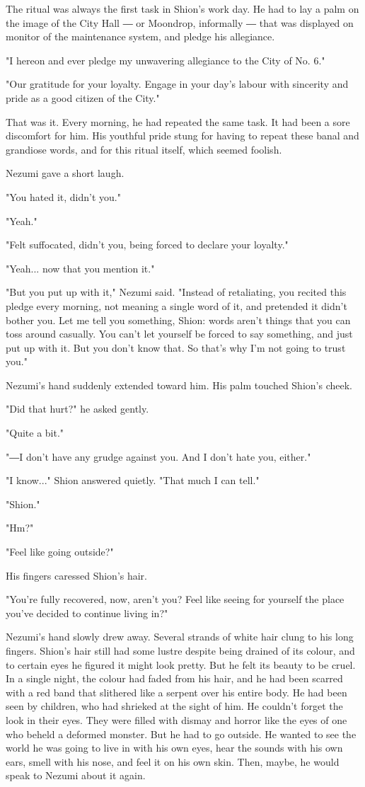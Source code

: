The ritual was always the first task in Shion's work day. He had to lay
a palm on the image of the City Hall ― or Moondrop, informally ― that
was displayed on monitor of the maintenance system, and pledge his
allegiance.

"I hereon and ever pledge my unwavering allegiance to the City of No.
6."

"Our gratitude for your loyalty. Engage in your day's labour with
sincerity and pride as a good citizen of the City."

That was it. Every morning, he had repeated the same task. It had been a
sore discomfort for him. His youthful pride stung for having to repeat
these banal and grandiose words, and for this ritual itself, which
seemed foolish.

Nezumi gave a short laugh.

"You hated it, didn't you."

"Yeah."

"Felt suffocated, didn't you, being forced to declare your loyalty."

"Yeah... now that you mention it."

"But you put up with it," Nezumi said. "Instead of retaliating, you
recited this pledge every morning, not meaning a single word of it, and
pretended it didn't bother you. Let me tell you something, Shion: words
aren't things that you can toss around casually. You can't let yourself
be forced to say something, and just put up with it. But you don't know
that. So that's why I'm not going to trust you."

Nezumi's hand suddenly extended toward him. His palm touched Shion's
cheek.

"Did that hurt?" he asked gently.

"Quite a bit."

"―I don't have any grudge against you. And I don't hate you, either."

"I know..." Shion answered quietly. "That much I can tell."

"Shion."

"Hm?"

"Feel like going outside?"

His fingers caressed Shion's hair.

"You're fully recovered, now, aren't you? Feel like seeing for yourself
the place you've decided to continue living in?"

Nezumi's hand slowly drew away. Several strands of white hair clung to
his long fingers. Shion's hair still had some lustre despite being
drained of its colour, and to certain eyes he figured it might look
pretty. But he felt its beauty to be cruel. In a single night, the
colour had faded from his hair, and he had been scarred with a red band
that slithered like a serpent over his entire body. He had been seen by
children, who had shrieked at the sight of him. He couldn't forget the
look in their eyes. They were filled with dismay and horror like the
eyes of one who beheld a deformed monster. But he had to go outside. He
wanted to see the world he was going to live in with his own eyes, hear
the sounds with his own ears, smell with his nose, and feel it on his
own skin. Then, maybe, he would speak to Nezumi about it again.


